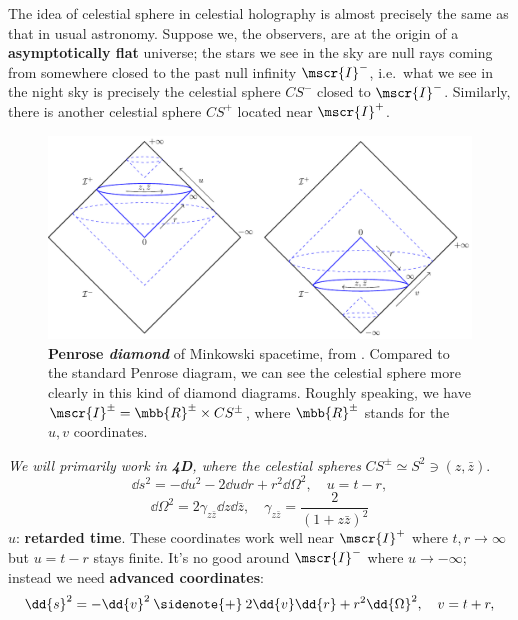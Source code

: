 \documentclass[a4paper
	,10pt
]{article}
\begin{document}
	The idea of celestial sphere in celestial holography is almost precisely the same as that in usual astronomy. Suppose we, the observers, are at the origin of a \textbf{asymptotically flat} universe; the stars we see in the sky are null rays coming from somewhere closed to the past null infinity $\mscr{I}^-$, i.e.~what we see in the night sky is precisely the celestial sphere $CS^-$ closed to $\mscr{I}^-$. Similarly, there is another celestial sphere $CS^+$ located near $\mscr{I}^+$. 
	
	\begin{figure}[!h]
	\centering
	\includegraphics[width=.85\linewidth]{img/bond.pdf}
	\caption[Penrose diamond of Minkowski spacetime]{
		\textbf{Penrose \textsl{diamond}} of Minkowski spacetime, from \cite{Strominger:2017zoo}. Compared to the standard Penrose diagram, we can see the celestial sphere more clearly in this kind of diamond diagrams. Roughly speaking, we have $\mscr{I}^\pm = \mbb{R}^\pm \times CS^\pm$, where $\mbb{R}^\pm$ stands for the $u,v$ coordinates.
	}
	\end{figure}
	
	\textsl{We will primarily work in \textbf{4D}, where the celestial spheres} $CS^\pm \simeq S^2 \ni (z,\bar{z})$. 
	\begin{equation}
		\dd{s}^2
		= - \dd{u}^2 - 2\dd{u} \dd{r}
			+ r^2 \dd{\Omega}^2,
	\quad
		u = t - r,
	\end{equation}
	\vspace{-.8\baselineskip}
	\begin{equation}
		\dd{\Omega}^2
		= 2\gamma_{z\bar{z}} \dd{z} \dd{\bar{z}},
	\quad
		\gamma_{z\bar{z}}
		= \frac{2}{(1 + z\bar{z})^2}
	\label{eq:metric_null_plus}
	\end{equation}
	$u$: \textbf{retarded time}. 
	These coordinates work well near $\mscr{I}^+$ where $t,r\to\infty$ but $u = t - r$ stays finite. It's no good around $\mscr{I}^-$ where $u\to -\infty$; instead we need \textbf{advanced coordinates}:
	\begin{equation}
		\dd{s}^2
		= - \dd{v}^2
			\mathbin{\sidenote{+}} 2\dd{v} \dd{r}
			+ r^2 \dd{\Omega}^2,
	\quad
		v = t + r,
	\end{equation}
	
\end{document}
